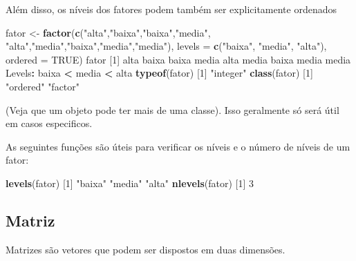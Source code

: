 \documentclass[10pt,a4paper]{book}
\newenvironment{Shaded}{\begin{snugshade}}{\end{snugshade}}
\newcommand{\KeywordTok}[1]{\textcolor[rgb]{0.13,0.29,0.53}{\textbf{#1}}}
\newcommand{\DataTypeTok}[1]{\textcolor[rgb]{0.13,0.29,0.53}{#1}}
\newcommand{\DecValTok}[1]{\textcolor[rgb]{0.00,0.00,0.81}{#1}}
\newcommand{\StringTok}[1]{\textcolor[rgb]{0.31,0.60,0.02}{#1}}
\newcommand{\OtherTok}[1]{\textcolor[rgb]{0.56,0.35,0.01}{#1}}
\newcommand{\OperatorTok}[1]{\textcolor[rgb]{0.81,0.36,0.00}{\textbf{#1}}}
\newcommand{\NormalTok}[1]{#1}
\begin{document}
Além disso, os níveis dos fatores podem também ser explicitamente
ordenados

\begin{Shaded}
\begin{Highlighting}[]
\NormalTok{fator <-}\StringTok{ }\KeywordTok{factor}\NormalTok{(}\KeywordTok{c}\NormalTok{(}\StringTok{"alta"}\NormalTok{,}\StringTok{"baixa"}\NormalTok{,}\StringTok{"baixa"}\NormalTok{,}\StringTok{"media"}\NormalTok{,}
                  \StringTok{"alta"}\NormalTok{,}\StringTok{"media"}\NormalTok{,}\StringTok{"baixa"}\NormalTok{,}\StringTok{"media"}\NormalTok{,}\StringTok{"media"}\NormalTok{),}
                \DataTypeTok{levels =} \KeywordTok{c}\NormalTok{(}\StringTok{"baixa"}\NormalTok{, }\StringTok{"media"}\NormalTok{, }\StringTok{"alta"}\NormalTok{),}
                \DataTypeTok{ordered =} \OtherTok{TRUE}\NormalTok{)}
\NormalTok{fator}
\NormalTok{[}\DecValTok{1}\NormalTok{] alta  baixa baixa media alta  media baixa media media}
\NormalTok{Levels}\OperatorTok{:}\StringTok{ }\NormalTok{baixa }\OperatorTok{<}\StringTok{ }\NormalTok{media }\OperatorTok{<}\StringTok{ }\NormalTok{alta}
\KeywordTok{typeof}\NormalTok{(fator)}
\NormalTok{[}\DecValTok{1}\NormalTok{] }\StringTok{"integer"}
\KeywordTok{class}\NormalTok{(fator)}
\NormalTok{[}\DecValTok{1}\NormalTok{] }\StringTok{"ordered"} \StringTok{"factor"} 
\end{Highlighting}
\end{Shaded}

(Veja que um objeto pode ter mais de uma classe). Isso geralmente só
será útil em casos especificos.

As seguintes funções são úteis para verificar os níveis e o número de
níveis de um fator:

\begin{Shaded}
\begin{Highlighting}[]
\KeywordTok{levels}\NormalTok{(fator)}
\NormalTok{[}\DecValTok{1}\NormalTok{] }\StringTok{"baixa"} \StringTok{"media"} \StringTok{"alta"} 
\KeywordTok{nlevels}\NormalTok{(fator)}
\NormalTok{[}\DecValTok{1}\NormalTok{] }\DecValTok{3}
\end{Highlighting}
\end{Shaded}

\subsection{Matriz}\label{matriz}

Matrizes são vetores que podem ser dispostos em duas dimensões.
\end{document}
